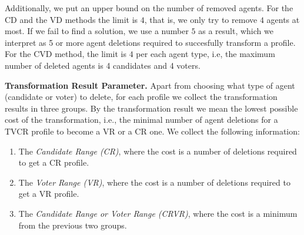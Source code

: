 Additionally, we put an upper bound on the number of removed agents.
For the CD and the VD methods the limit is $4$, that is, we only try to remove $4$ agents at most.
If we fail to find a solution, we use a number $5$ as a result,
which we interpret as 5 or more agent deletions required to succesfully transform a profile. 
For the CVD method, the limit is $4$ per each agent type, i.e, the maximum number of deleted agents is 4 candidates and 4 voters. 
\newline

\noindent \textbf{Transformation Result Parameter.} \indent Apart from choosing what type of agent (candidate or voter) to delete,
for each profile we collect the transformation results in three groups.
By the transformation result we mean the lowest possible cost of the transformation,
i.e., the minimal number of agent deletions for a TVCR profile to become a VR or a CR one.
We collect the following information:

\begin{enumerate}
    \item The \textit{Candidate Range (CR)}, where the cost is a number of deletions required to get a CR profile.
    \item The \textit{Voter Range (VR)}, where the cost is a number of deletions required to get a VR profile.
    \item The \textit{Candidate Range or Voter Range (CRVR)}, where the cost is a minimum from the previous two groups. 
\end{enumerate}


